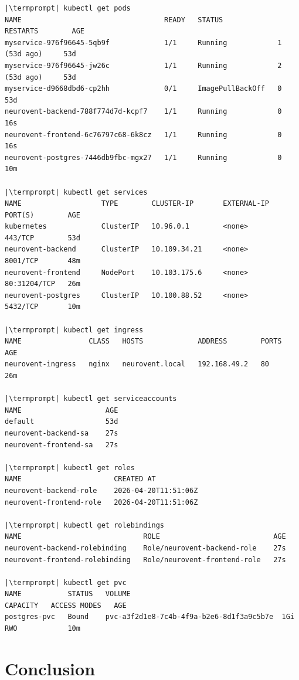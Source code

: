 \documentclass[12pt,a4paper]{article}
\makeatletter
\newcommand{\termprompt}{%
  \textcolor{termgreen}{\textbf{azouaou@Az-zou}}%
  \textcolor{termfg}{:}%
  \textcolor{termcyan}{\textasciitilde/NeuroVent}%
  \textcolor{termfg}{\$}}
\makeatother
\begin{document}
\begin{lstlisting}[style=terminal, caption={État complet du cluster}]
|\termprompt| kubectl get pods
NAME                                  READY   STATUS             RESTARTS        AGE
myservice-976f96645-5qb9f             1/1     Running            1 (53d ago)     53d
myservice-976f96645-jw26c             1/1     Running            2 (53d ago)     53d
myservice-d9668dbd6-cp2hh             0/1     ImagePullBackOff   0               53d
neurovent-backend-788f774d7d-kcpf7    1/1     Running            0               16s
neurovent-frontend-6c76797c68-6k8cz   1/1     Running            0               16s
neurovent-postgres-7446db9fbc-mgx27   1/1     Running            0               10m

|\termprompt| kubectl get services
NAME                   TYPE        CLUSTER-IP       EXTERNAL-IP   PORT(S)        AGE
kubernetes             ClusterIP   10.96.0.1        <none>        443/TCP        53d
neurovent-backend      ClusterIP   10.109.34.21     <none>        8001/TCP       48m
neurovent-frontend     NodePort    10.103.175.6     <none>        80:31204/TCP   26m
neurovent-postgres     ClusterIP   10.100.88.52     <none>        5432/TCP       10m

|\termprompt| kubectl get ingress
NAME                CLASS   HOSTS             ADDRESS        PORTS   AGE
neurovent-ingress   nginx   neurovent.local   192.168.49.2   80      26m

|\termprompt| kubectl get serviceaccounts
NAME                    AGE
default                 53d
neurovent-backend-sa    27s
neurovent-frontend-sa   27s

|\termprompt| kubectl get roles
NAME                      CREATED AT
neurovent-backend-role    2026-04-20T11:51:06Z
neurovent-frontend-role   2026-04-20T11:51:06Z

|\termprompt| kubectl get rolebindings
NAME                             ROLE                           AGE
neurovent-backend-rolebinding    Role/neurovent-backend-role    27s
neurovent-frontend-rolebinding   Role/neurovent-frontend-role   27s

|\termprompt| kubectl get pvc
NAME           STATUS   VOLUME                                     CAPACITY   ACCESS MODES   AGE
postgres-pvc   Bound    pvc-a3f2d1e8-7c4b-4f9a-b2e6-8d1f3a9c5b7e  1Gi        RWO            10m
\end{lstlisting}

\section{Conclusion}
\end{document}
